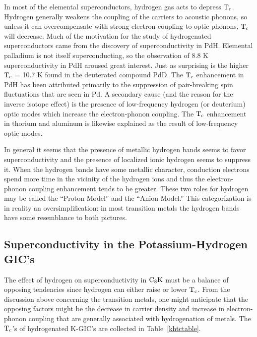         In  most  of the  elemental  superconductors,  hydrogen gas acts to
depress   $\rm    T_c$.\cite{stritzker78} Hydrogen generally  weakens   the
coupling  of the carriers     to   acoustic  phonons,  so   unless  it  can
overcompensate with strong electron coupling  to  optic phonons, $\rm  T_c$
will  decrease.\cite{gupta81} Much of  the motivation   for   the  study of
hydrogenated  superconductors came  from the discovery of superconductivity
in    PdH.  Elemental palladium   is   not  itself  superconducting, so the
observation    of 8.8   K superconductivity     in    PdH   aroused   great
interest.\cite{stritzker78} Just  as  surprising is the  higher $\rm T_c$ =
10.7 K found in the deuterated compound PdD.  The $\rm T_c$  enhancement in
PdH has been attributed primarily  to the suppression of pair-breaking spin
fluctuations that are seen in  Pd.\cite{stritzker78} A secondary cause (and
the reason for the inverse isotope effect) is the presence of low-frequency
hydrogen (or  deuterium)  optic modes  which  increase  the electron-phonon
coupling.\cite{economou81,gupta81} The $\rm T_c$ enhancement in thorium and
aluminum  is   likewise explained as  the   result of  low-frequency  optic
modes.\cite{economou81,gupta81}

        In general it  seems  that the presence  of metallic hydrogen bands
seems  to  favor superconductivity and the    presence  of localized  ionic
hydrogen seems to suppress it.  When the hydrogen bands have  some metallic
character,  conduction electrons spend  more time  in  the  vicinity of the
hydrogen ions and thus the electron-phonon coupling enhancement tends to be
greater.\cite{economou81} These  two  roles for hydrogen may be  called the
``Proton   Model'' and     the   ``Anion Model.''\cite{switendick78}   This
categorization is in  reality  an  oversimplification: in   most transition
metals   the      hydrogen   bands   have   some   resemblance     to  both
pictures.\cite{switendick78}


\subsection{Superconductivity in the Po\-tas\-sium-Hy\-dro\-gen GIC's}
\label{khcompounds}

        The effect of hydrogen on superconductivity in $\rm C_8K$ must be a
balance  of opposing tendencies  since hydrogen can   either raise or lower
$\rm T_c$.  From the discussion above concerning the transition metals, one
might anticipate that the opposing factors might be the decrease in carrier
density and  increase  in  electron-phonon  coupling  that   are  generally
associated with hydrogenation of metals.\cite{switendick78} The $\rm T_c$'s
of hydrogenated K-GIC's are collected in Table~\ref{khtctable}.

